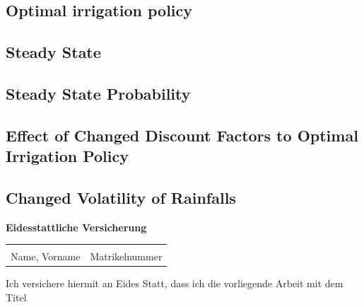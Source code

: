 \documentclass[12pt, a4paper, oneside]{article}
\begin{document}
	\subsection{Optimal irrigation policy}
	\subsection{Steady State}
	\subsection{Steady State Probability}
	\subsection{Effect of Changed Discount Factors to Optimal Irrigation Policy}
	\subsection{Changed Volatility of Rainfalls}

	\printbibliography

	\newpage
	
	
	
	\begingroup
	\begin{center}
		\large
		\textbf{Eidesstattliche Versicherung}
	\end{center}
	
	\vspace{0.3cm}
	
	\begin{tabular}{@{}p{8cm}p{5.8cm}}
		\underline{\hspace{6cm}} & \underline{\hspace{5.8cm}} \\
		\vspace{0.02cm}Name, Vorname & \vspace{0.02cm}Matrikelnummer \\
	\end{tabular}
	\vspace{0.3cm}
	
	Ich versichere hiermit an Eides Statt, dass ich die vorliegende Arbeit mit dem Titel

	\begin{center}
		{\makeatletter{\emph{{\@title}}}\makeatother}
	\end{center}
	
\end{document}
